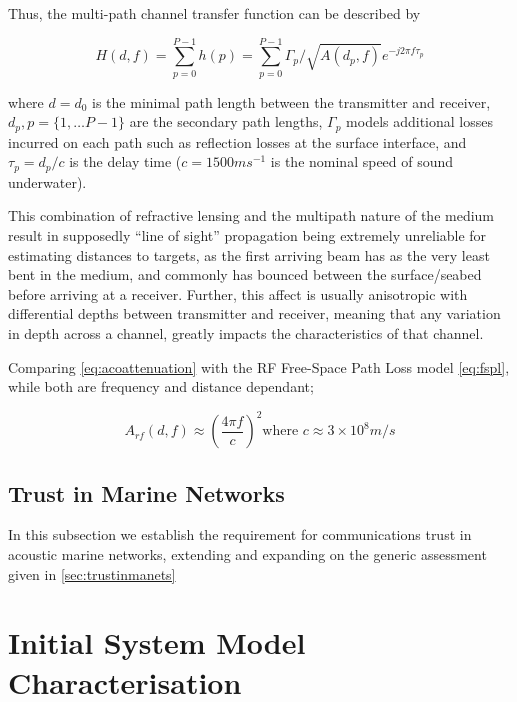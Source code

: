 \documentclass[runningheads,a4paper]{llncs}
\begin{document}
Thus, the multi-path channel transfer function can be described by 

\begin{equation}
  \label{eq:acomultipath}
  H(d,f) =\sum_{p=0}^{P-1} h(p) = \sum_{p=0}^{P-1} \Gamma_p / \sqrt{A(d_p,f)}e^{-j 2 \pi f \tau_p}
\end{equation}

where $d=d_0$ is the minimal path length between the transmitter and receiver, $d_p,p=\{1,\dots P-1\}$ are the secondary path lengths, $\Gamma_p$ models additional losses incurred on each path such as reflection losses at the surface interface, and $\tau_p = d_p/c$ is the delay time ($c = 1500 ms^{-1}$ is the nominal speed of sound underwater).


This combination of refractive lensing and the multipath nature of the medium result in supposedly ``line of sight'' propagation being extremely unreliable for estimating distances to targets, as the first arriving beam has as the very least bent in the medium, and commonly has bounced between the surface/seabed before arriving at a receiver.
Further, this affect is usually anisotropic with differential depths between transmitter and receiver, meaning that any variation in depth across a channel, greatly impacts the characteristics of that channel.

Comparing \eqref{eq:acoattenuation} with the RF Free-Space Path Loss model \eqref{eq:fspl}, while both are frequency and distance dependant; 

\begin{equation}
  \label{eq:fspl}
  A_{rf}(d,f) \approx \left( \frac{4\pi f}{c} \right)^2
  \text{where }c\approx 3\times10^8m/s
\end{equation}



\subsection{Trust in Marine Networks}

In this subsection we establish the requirement for communications trust in acoustic marine networks, extending and expanding on the generic assessment given in \ref{sec:trustinmanets}


\section{Initial System Model Characterisation}\label{sec:initialsystemcharacterisation}
\end{document}
